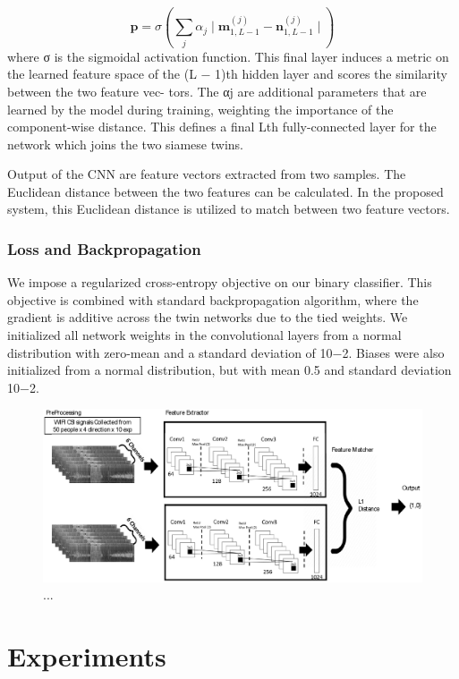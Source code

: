 \documentclass[runningheads]{llncs}
\begin{document}
\begin{equation}
    \mathbf{p} = 
    \sigma(\sum_j\alpha_{j}\mid
    \mathbf{m}_{1,L-1}^{(j)} - 
    \mathbf{n}_{1,L-1}^{(j)}\mid)  
\end{equation}
where σ is the sigmoidal
activation function. This final layer induces a metric on the learned feature space of the (L − 1)th hidden layer and scores the similarity between the two feature vec- tors. The αj are additional parameters that are learned by the model during training, weighting the importance of the component-wise distance. This defines a final Lth fully-connected layer for the network which joins the two siamese twins.



Output of the CNN are feature vectors extracted from two samples. The Euclidean distance between the two features can be calculated.
In the proposed system, this Euclidean distance is utilized to match between two feature vectors.

\subsubsection{Loss and Backpropagation}
 We impose a regularized cross-entropy objective on our binary classifier.
This objective is combined with standard backpropagation algorithm, where the gradient is additive across the twin networks due to the tied weights.
 We initialized all network weights in the convolutional layers from a normal distribution with zero-mean and a standard deviation of 10−2. Biases were also initialized from a normal distribution, but with mean 0.5 and standard deviation 10−2.
\begin{figure}
\includegraphics[width=\textwidth]{network1.eps}
\caption{...} \label{network1}
\end{figure}

\section{Experiments}
\end{document}
